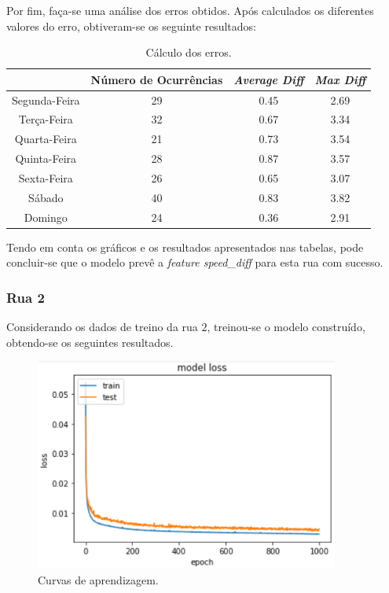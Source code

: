 \documentclass[a4paper, 12pt]{article}
\begin{document}
Por fim, faça-se uma análise dos erros obtidos. Após calculados os diferentes valores do erro, obtiveram-se os seguinte resultados:

\begin{table}[H]
\centering
\begin{tabular}{||c||c|c|c||}
	\hline\hline
	 & Número de Ocurrências & \textit{Average Diff} & \textit{Max Diff} \\
	\hline\hline
	Segunda-Feira & 29&
	0.45
 & 2.69\\
	\hline
	 Terça-Feira  &32&
	0.67
 & 3.34\\
	\hline
	 Quarta-Feira & 21&
	0.73
 & 3.54
 \\
	\hline
	 Quinta-Feira  & 28&
	0.87
 & 3.57
   \\
	\hline
	 Sexta-Feira & 26&
	0.65 & 3.07
 \\
	\hline
	 Sábado  & 40&
	0.83 & 3.82   \\
	\hline
	 Domingo & 24&
0.36
 & 
2.91
 \\
	\hline\hline
\end{tabular}
\label{table:rua1}
\caption{Cálculo dos erros.}
\end{table}

Tendo em conta os gráficos e os resultados apresentados nas tabelas, pode concluir-se que o modelo prevê a \textit{feature speed\_diff} para esta rua com sucesso.

\subsubsection{Rua 2}

Considerando os dados de treino da rua $2$, treinou-se o modelo construído, obtendo-se os seguintes resultados.

\begin{figure}[H]
	\centering
	\includegraphics[width=10cm]{resultados/curvas_aprend_2.png}
	\caption{Curvas de aprendizagem.}
\end{figure}
\end{document}
